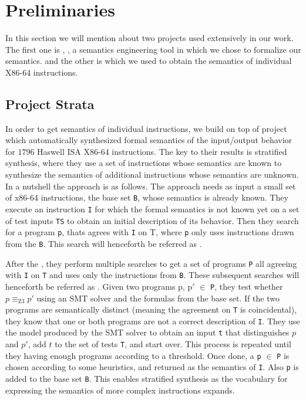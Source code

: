 \section{Preliminaries} \label{sec:Prilim}
In this section we will mention about two projects used extensively in our work. The first one is \K{}, , a semantics engineering tool in
which we chose to formalize our semantics. and the other is \Strata which we used to
obtain the semantics of individual X86-64 instructions.    

\subsection{Project Strata}

In order to get semantics of individual instructions, we build on top of project
\Strata~\cite{Heule2016a} which automatically synthesized formal semantics  of
the input/output behavior for $1796$ Haswell ISA X86-64 instructions. The key to
their results is stratified synthesis, where they use a set of instructions
whose semantics are known to synthesize the semantics of additional instructions
whose semantics are unknown. 
In a nutshell the approach is as follows. The approach needs as input  a small set of x86-64 instructions, the base set {\tt B}, whose semantics is already known. They execute
an instruction {\tt I} for which the formal semantics is not known yet on a set of test inputs {\tt TS} to obtain an initial description of its behavior. Then they search for a program {\tt p}, thats agrees with {\tt I} on T,  where {\tt p} only uses instructions drawn from the {\tt B}. This search will henceforth be referred as \initS{}. 



After the \initS{}, they perform multiple searches to get a set of programs {\tt P} all agreeing with {\tt I} on {\tt T} and uses only the instructions from {\tt B}. These subsequent searches will henceforth be referred as \secS{}. Given two programs p, p$\prime$ $\in$ {\tt P}, they test whether $p\equiv_\text{Z3}p\prime$ using an SMT solver and the formulas from the base set. If the two programs are semantically distinct (meaning
the agreement on {\tt T} is coincidental), they know that one or both programs are not a correct description of {\tt I}. They use the model produced by the SMT solver to obtain an input {\tt t} that distinguishes $p$ and $p\prime$, add $t$ to the set of tests {\tt T}, and start over. This process is  repeated until they having enough programs according to a threshold. Once done, a {\tt p} $\in$ {\tt P} is chosen according to some heuristics, and returned as the semantics of {\tt I}. Also {\tt p} is added to the base set {\tt B}.  This  enables stratified synthesis  as the vocabulary for expressing the semantics of more complex instructions expands.


